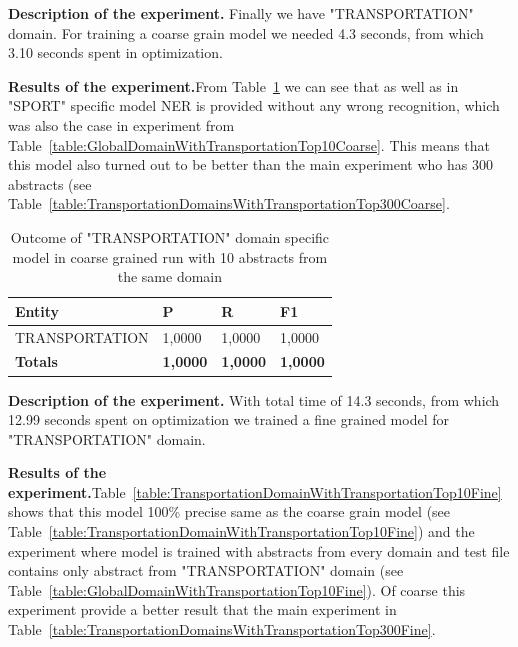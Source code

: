 \documentclass[thesis=M,english]{FITthesis}[2018/05/30]
\begin{document}
	\textbf{Description of the experiment.} Finally we have "TRANSPORTATION" domain. For training a coarse grain model we needed 4.3 seconds, from which 3.10 seconds spent in optimization. 
	
	\textbf{Results of the experiment.}From Table~\ref{table:TransportationDomainWithTransportationTop10Coarse} we can see that as well as in "SPORT" specific model NER is provided without any wrong recognition, which was also the case in experiment from Table~\ref{table:GlobalDomainWithTransportationTop10Coarse}. This means that this model also turned out to be better than the main experiment who has 300 abstracts (see Table~\ref{table:TransportationDomainsWithTransportationTop300Coarse}.
	
	\begin{table}[H]\centering
		\begin{tabular}{|l|l|l|l|}
			\hline {\textbf{Entity}} & {\textbf{P}} & {\textbf{R}} & {\textbf{F1}}\\\hline
				TRANSPORTATION & 1,0000 & 1,0000 & 1,0000\\\hline
				\textbf{Totals} & \textbf{1,0000} & \textbf{1,0000} & \textbf{1,0000}\\\hline
		\end{tabular}
		\caption{Outcome of "TRANSPORTATION" domain specific model in coarse grained run with 10 abstracts from the same domain \label{table:TransportationDomainWithTransportationTop10Coarse}}
	\end{table}

	\textbf{Description of the experiment.} With total time of 14.3 seconds, from which 12.99 seconds spent on optimization we trained a fine grained model for "TRANSPORTATION" domain. 
	
	\textbf{Results of the experiment.}Table~\ref{table:TransportationDomainWithTransportationTop10Fine} shows that this model 100\% precise same as the coarse grain model (see Table~\ref{table:TransportationDomainWithTransportationTop10Fine}) and the experiment where model is trained with abstracts from every domain and test file contains only abstract from "TRANSPORTATION" domain (see Table~\ref{table:GlobalDomainWithTransportationTop10Fine}). Of coarse this experiment provide a better result that the main experiment in Table~\ref{table:TransportationDomainsWithTransportationTop300Fine}.   
   
\end{document}
